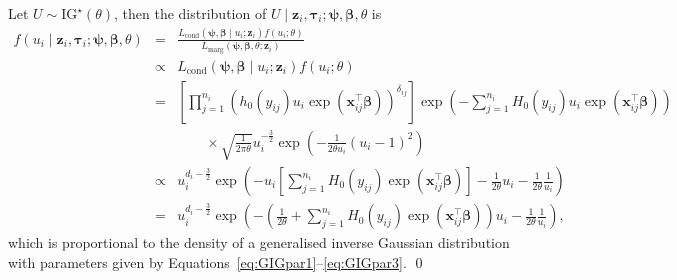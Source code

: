 Let $U \sim \textrm{IG}^{\star} ( \theta)$, then the distribution of 
  $U \mid \bm{z}_{i}, \bm \tau_i; \bm{\psi}, \bm{\beta}, \theta$ is
\begin{eqnarray*}
f ( u_i \mid \bm{z}_{i}, \bm{\tau}_{i}; \bm{\psi}, \bm{\beta}, \theta ) 
  & = & \frac{
    L_{\textrm{cond}} \left( \bm{\psi}, \bm{\beta} \mid u_{i}; \bm{z}_i \right) f ( u_{i}; \theta )
  }{
    L_{\textrm{marg}} \left( \bm{\psi}, \bm{\beta}, \theta; \bm{z}_i \right)
  } \\
  &\propto& L_{\textrm{cond}} \left( \bm{\psi}, \bm{\beta} \mid u_{i}; \bm{z}_i \right) f ( u_{i}; \theta ) \\
  & = & \displaystyle \left[ 
      \prod_{j=1}^{n_{i}} \left( h_{0} ( y_{ij} ) u_i \exp ( \bm{x}^\top_{ij} \bm{\beta} ) \right)^{\delta_{ij}} 
    \right] 
    \exp \left( - \sum_{j=1}^{n_{i}} H_{0} ( y_{ij} ) u_i \exp ( \bm{x}^\top_{ij} \bm{\beta} ) \right) \\
    && \qquad \times \sqrt{\frac{1}{2 \pi \theta}} 
    u_i^{-\tfrac32} 
    \exp \left( -\frac{1}{2 \theta u_{i}} ( u_i - 1 )^{2} \right)   \\
  &\propto& u_i^{d_i - \tfrac32} \exp \left( - u_i 
    \left[\sum_{j=1}^{n_{i}} H_{0} ( y_{ij} ) \exp ( \bm{x}^\top_{ij} \bm{\beta} ) \right] - 
          \frac{1}{2 \theta} u_i - \frac{1}{2 \theta} \frac{1}{u_{i}} \right) \\
  & = & u_{i}^{d_i - \tfrac32} \exp \left( - \left( \frac{1}{2 \theta} + \sum_{j=1}^{n_{i}} H_{0} ( y_{ij} ) \exp ( \bm{x}^\top_{ij} \bm{\beta} ) \right) u_i - 
          \frac{1}{2 \theta} \frac{1}{u_{i}} \right),
\end{eqnarray*}
which is proportional to the density of a generalised inverse Gaussian distribution \cite[Section~A.3.6]{Hougaard00}
with parameters given by Equations~\ref{eq:GIGpar1}--\ref{eq:GIGpar3}.
\qed